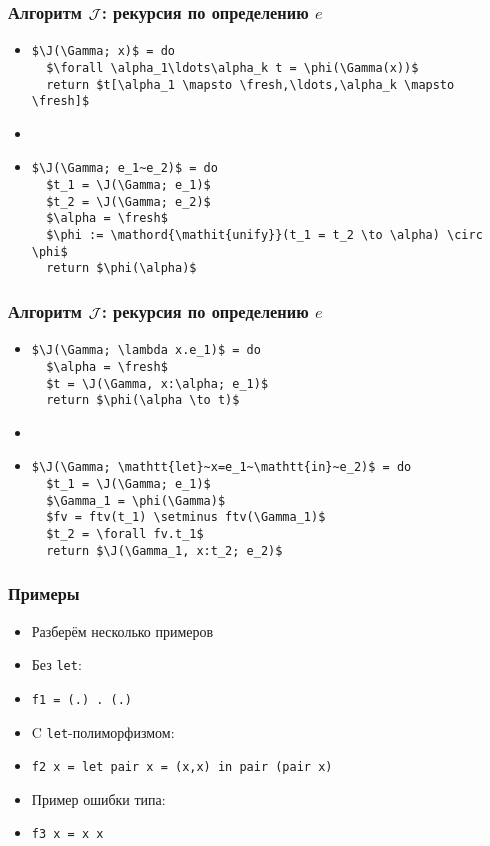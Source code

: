 \documentclass[11pt]{beamer}
\begin{document}
\begin{frame}[fragile]
\frametitle{Алгоритм $\mathcal{J}$: рекурсия по определению $e$}
\begin{itemize}
    \item 
\begin{lstlisting}[mathescape]
$\J(\Gamma; x)$ = do
  $\forall \alpha_1\ldots\alpha_k t = \phi(\Gamma(x))$
  return $t[\alpha_1 \mapsto \fresh,\ldots,\alpha_k \mapsto \fresh]$
\end{lstlisting}
    \item[] \pause
    \item 
\begin{lstlisting}[mathescape]
$\J(\Gamma; e_1~e_2)$ = do
  $t_1 = \J(\Gamma; e_1)$
  $t_2 = \J(\Gamma; e_2)$
  $\alpha = \fresh$
  $\phi := \mathord{\mathit{unify}}(t_1 = t_2 \to \alpha) \circ \phi$
  return $\phi(\alpha)$
\end{lstlisting}
\end{itemize}
\end{frame}

\begin{frame}[fragile]
\frametitle{Алгоритм $\mathcal{J}$: рекурсия по определению $e$}
\begin{itemize}
\item 
\begin{lstlisting}[mathescape]
$\J(\Gamma; \lambda x.e_1)$ = do
  $\alpha = \fresh$
  $t = \J(\Gamma, x:\alpha; e_1)$
  return $\phi(\alpha \to t)$
\end{lstlisting}
    \item[] \pause
\item 
\begin{lstlisting}[mathescape]
$\J(\Gamma; \mathtt{let}~x=e_1~\mathtt{in}~e_2)$ = do
  $t_1 = \J(\Gamma; e_1)$
  $\Gamma_1 = \phi(\Gamma)$
  $fv = ftv(t_1) \setminus ftv(\Gamma_1)$
  $t_2 = \forall fv.t_1$
  return $\J(\Gamma_1, x:t_2; e_2)$
\end{lstlisting}
\end{itemize}
\end{frame}

\begin{frame}[fragile]
\frametitle{Примеры}
\begin{itemize}
    \item Разберём несколько примеров
    \pause
    \item Без \lstinline|let|:
    \item[] \lstinline|f1 = (.) . (.)|
    \pause
    \item C \lstinline|let|-полиморфизмом:
    \item[] \lstinline|f2 x = let pair x = (x,x) in pair (pair x)|
    \pause
    \item Пример ошибки типа:
    \item[] \lstinline|f3 x = x x|
\end{itemize}
\end{frame}
\end{document}
